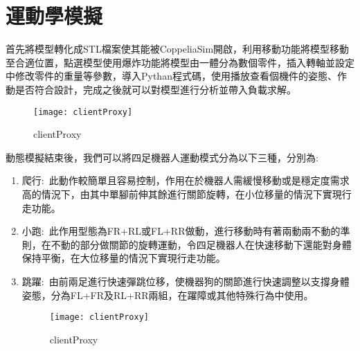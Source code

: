 \section{運動學模擬}
首先將模型轉化成STL檔案使其能被CoppeliaSim開啟，利用移動功能將模型移動至合適位置，點選模型使用爆炸功能將模型由一體分為數個零件，插入轉軸並設定中修改零件的重量等參數，導入Pythan程式碼，使用播放查看個機件的姿態、作動是否符合設計，完成之後就可以對模型進行分析並帶入負載求解。\\

\begin{figure}[hbt!]
\begin{center}
\texttt{[image: clientProxy]}
\caption{\Large clientProxy}\label{clientProxy}
\end{center}
\end{figure}

動態模擬結束後，我們可以將四足機器人運動模式分為以下三種，分別為:\
\begin{enumerate}
\item 爬行:\
此動作較簡單且容易控制，作用在於機器人需緩慢移動或是穩定度需求高的情況下，由其中單腳前伸其餘進行關節旋轉，在小位移量的情況下實現行走功能。\\

\item 小跑:\
此作用型態為FR+RL或FL+RR做動，進行移動時有著兩動兩不動的準則，在不動的部分做關節的旋轉運動，令四足機器人在快速移動下還能對身體保持平衡，在大位移量的情況下實現行走功能。\\

\item 跳躍:\
由前兩足進行快速彈跳位移，使機器狗的關節進行快速調整以支撐身體姿態，分為FL+FR及RL+RR兩組，在躍障或其他特殊行為中使用。\\

\begin{figure}[hbt!]
\begin{center}
\texttt{[image: clientProxy]}
\caption{\Large clientProxy}\label{clientProxy}
\end{center}
\end{figure}
\end{enumerate}
\newpage
